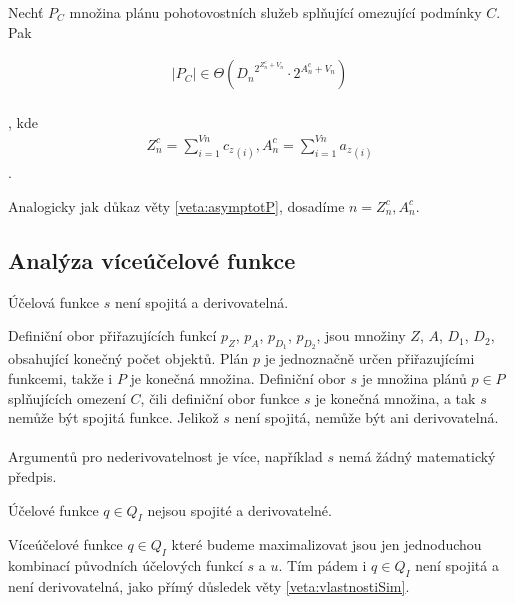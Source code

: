 \begin{veta}
  Nechť $P_C$ množina plánu pohotovostních služeb splňující omezující podmínky $C$. Pak 

  \begin{align*}
    |P_C| \in \Theta({D_n}^{2^{Z^c_n + V_n}} \cdot 2^{A^c_n + V_n})
  \end{align*}
  \\
  , kde
  \begin{align*}
    Z^c_n = \sum_{i=1}^{Vn} {c_z}_{(i)}, A^c_n = \sum_{i=1}^{Vn} {a_z}_{(i)}
  \end{align*}
  .
  \\
\end{veta}
\begin{dukaz}
  Analogicky jak důkaz věty \ref{veta:asymptotP}, dosadíme $n = Z^c_n, A^c_n$.
  \\
\end{dukaz}

\subsection{Analýza víceúčelové funkce}\label{kap:analVicF}

\begin{veta}\label{veta:vlastnostiSim}
  Účelová funkce $s$ není spojitá a derivovatelná.
\end{veta}

\begin{dukaz}
  Definiční obor přiřazujících funkcí $p_Z$, $p_A$, $p_{D_{1}}$, $p_{D_{2}}$, jsou množiny $Z$, $A$, $D_1$, $D_2$, obsahující konečný počet objektů.
  Plán $p$ je jednoznačně určen přiřazujícími funkcemi, takže i $P$ je konečná množina.
  Definiční obor $s$ je množina plánů $p \in P$ splňujících omezení $C$, čili definiční obor funkce $s$ je konečná množina, a tak $s$ nemůže být spojitá funkce.
  Jelikož $s$ není spojitá, nemůže být ani derivovatelná.
  \\
  \\
  Argumentů pro nederivovatelnost je více, například $s$ nemá žádný matematický předpis.
  \\
\end{dukaz}

\begin{veta}\label{veta:nespANedevQ}
  Účelové funkce $q \in Q_I$ nejsou spojité a derivovatelné.
\end{veta}
\begin{dukaz}
  Víceúčelové funkce $q \in Q_I$ které budeme maximalizovat jsou jen jednoduchou kombinací původních účelových funkcí $s$ a $u$.
  Tím pádem i $q \in Q_I$ není spojitá a není derivovatelná, jako přímý důsledek věty \ref{veta:vlastnostiSim}. 
  \\
\end{dukaz}

